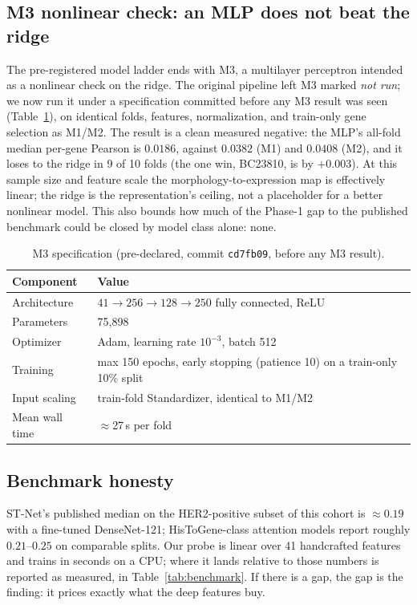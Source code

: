 \documentclass[11pt]{article}
\begin{document}
\subsection{M3 nonlinear check: an MLP does not beat the ridge}
The pre-registered model ladder ends with M3, a multilayer perceptron intended
as a nonlinear check on the ridge. The original pipeline left M3 marked
\emph{not run}; we now run it under a specification committed before any M3
result was seen (Table~\ref{tab:m3spec}), on identical folds, features,
normalization, and train-only gene selection as M1/M2. The result is a clean
measured negative: the MLP's all-fold median per-gene Pearson is $0.0186$,
against $0.0382$ (M1) and $0.0408$ (M2), and it loses to the ridge in 9 of 10
folds (the one win, BC23810, is by $+0.003$). At this sample size and feature
scale the morphology-to-expression map is effectively linear; the ridge is the
representation's ceiling, not a placeholder for a better nonlinear model. This
also bounds how much of the Phase-1 gap to the published benchmark could be
closed by model class alone: none.

\begin{table}[h]
\centering\small
\caption{M3 specification (pre-declared, commit \texttt{cd7fb09}, before any M3 result).}
\label{tab:m3spec}
\begin{tabular}{ll}
\hline
Component & Value \\
\hline
Architecture & $41 \to 256 \to 128 \to 250$ fully connected, ReLU \\
Parameters & 75{,}898 \\
Optimizer & Adam, learning rate $10^{-3}$, batch 512 \\
Training & max 150 epochs, early stopping (patience 10) on a train-only 10\% split \\
Input scaling & train-fold Standardizer, identical to M1/M2 \\
Mean wall time & $\approx$27\,s per fold \\
\hline
\end{tabular}
\end{table}

\subsection{Benchmark honesty}
ST-Net's published median on the HER2-positive subset of this cohort is
$\approx 0.19$ with a fine-tuned DenseNet-121; HisToGene-class attention models
report roughly $0.21$--$0.25$ on comparable splits. Our probe is linear over 41
handcrafted features and trains in seconds on a CPU; where it lands relative to those
numbers is reported as measured, in Table~\ref{tab:benchmark}. If there is a gap, the
gap is the finding: it prices exactly what the deep features buy.
\end{document}

